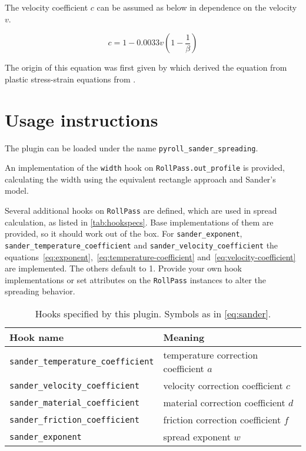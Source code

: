\documentclass[11pt]{PyRollDocs}
\begin{document}
    \noindent The velocity coefficient $c$ can be assumed as below in dependence on the velocity $v$.

    \begin{equation}
        c = 1 - 0.0033 v \left( 1 - \frac{1}{\beta} \right)
        \label{eq:velocity-coefficient}
    \end{equation}

    The origin of this equation was first given by \textcite{Hill1955} which derived the equation from plastic stress-strain equations from \textcite{Mises1913}.


    \section{Usage instructions}\label{sec:usage-instructions}

    The plugin can be loaded under the name \texttt{pyroll\_sander\_spreading}.

    An implementation of the \lstinline{width} hook on \lstinline{RollPass.out_profile} is provided,
    calculating the width using the equivalent rectangle approach and Sander's model.

    Several additional hooks on \lstinline{RollPass} are defined, which are used in spread calculation, as listed in \autoref{tab:hookspecs}.
    Base implementations of them are provided, so it should work out of the box.
    For \lstinline{sander_exponent}, \lstinline{sander_temperature_coefficient} and \lstinline{sander_velocity_coefficient}
    the equations~\ref{eq:exponent},~\ref{eq:temperature-coefficient} and~\ref{eq:velocity-coefficient} are implemented.
    The others default to \num{1}.
    Provide your own hook implementations or set attributes on the \lstinline{RollPass} instances to alter the spreading behavior.

    \begin{table}
        \centering
        \caption{Hooks specified by this plugin. Symbols as in \autoref{eq:sander}.}
        \label{tab:hookspecs}
        \begin{tabular}{ll}
            \toprule
            Hook name                                 & Meaning                                \\
            \midrule
            \texttt{sander\_temperature\_coefficient} & temperature correction coefficient $a$ \\
            \texttt{sander\_velocity\_coefficient}    & velocity correction coefficient $c$    \\
            \texttt{sander\_material\_coefficient}    & material correction coefficient $d$    \\
            \texttt{sander\_friction\_coefficient}    & friction correction coefficient $f$    \\
            \texttt{sander\_exponent}                 & spread exponent $w$                    \\
            \bottomrule
        \end{tabular}
    \end{table}

    \printbibliography
\end{document}
